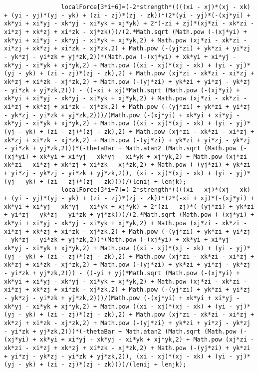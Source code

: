 \begin{lstlisting}
				localForce[3*i+6]=(-2*strength*((((xi - xj)*(xj - xk) + (yi - yj)*(yj - yk) + (zi - zj)*(zj - zk))*(2*(yi - yj)*(-(xj*yi) + xk*yi + xi*yj - xk*yj - xi*yk + xj*yk) + 2*(-zi + zj)*(xj*zi - xk*zi - xi*zj + xk*zj + xi*zk - xj*zk)))/(2.*Math.sqrt (Math.pow (-(xj*yi) + xk*yi + xi*yj - xk*yj - xi*yk + xj*yk,2) + Math.pow (xj*zi - xk*zi - xi*zj + xk*zj + xi*zk - xj*zk,2) + Math.pow (-(yj*zi) + yk*zi + yi*zj - yk*zj - yi*zk + yj*zk,2))*(Math.pow (-(xj*yi) + xk*yi + xi*yj - xk*yj - xi*yk + xj*yk,2) + Math.pow ((xi - xj)*(xj - xk) + (yi - yj)*(yj - yk) + (zi - zj)*(zj - zk),2) + Math.pow (xj*zi - xk*zi - xi*zj + xk*zj + xi*zk - xj*zk,2) + Math.pow (-(yj*zi) + yk*zi + yi*zj - yk*zj - yi*zk + yj*zk,2))) - ((-xi + xj)*Math.sqrt (Math.pow (-(xj*yi) + xk*yi + xi*yj - xk*yj - xi*yk + xj*yk,2) + Math.pow (xj*zi - xk*zi - xi*zj + xk*zj + xi*zk - xj*zk,2) + Math.pow (-(yj*zi) + yk*zi + yi*zj - yk*zj - yi*zk + yj*zk,2)))/(Math.pow (-(xj*yi) + xk*yi + xi*yj - xk*yj - xi*yk + xj*yk,2) + Math.pow ((xi - xj)*(xj - xk) + (yi - yj)*(yj - yk) + (zi - zj)*(zj - zk),2) + Math.pow (xj*zi - xk*zi - xi*zj + xk*zj + xi*zk - xj*zk,2) + Math.pow (-(yj*zi) + yk*zi + yi*zj - yk*zj - yi*zk + yj*zk,2)))*(-thetaBar + Math.atan2 (Math.sqrt (Math.pow (-(xj*yi) + xk*yi + xi*yj - xk*yj - xi*yk + xj*yk,2) + Math.pow (xj*zi - xk*zi - xi*zj + xk*zj + xi*zk - xj*zk,2) + Math.pow (-(yj*zi) + yk*zi + yi*zj - yk*zj - yi*zk + yj*zk,2)), (xi - xj)*(xj - xk) + (yi - yj)*(yj - yk) + (zi - zj)*(zj - zk))))/(lenij + lenjk);
				localForce[3*i+7]=(-2*strength*((((xi - xj)*(xj - xk) + (yi - yj)*(yj - yk) + (zi - zj)*(zj - zk))*(2*(-xi + xj)*(-(xj*yi) + xk*yi + xi*yj - xk*yj - xi*yk + xj*yk) + 2*(zi - zj)*(-(yj*zi) + yk*zi + yi*zj - yk*zj - yi*zk + yj*zk)))/(2.*Math.sqrt (Math.pow (-(xj*yi) + xk*yi + xi*yj - xk*yj - xi*yk + xj*yk,2) + Math.pow (xj*zi - xk*zi - xi*zj + xk*zj + xi*zk - xj*zk,2) + Math.pow (-(yj*zi) + yk*zi + yi*zj - yk*zj - yi*zk + yj*zk,2))*(Math.pow (-(xj*yi) + xk*yi + xi*yj - xk*yj - xi*yk + xj*yk,2) + Math.pow ((xi - xj)*(xj - xk) + (yi - yj)*(yj - yk) + (zi - zj)*(zj - zk),2) + Math.pow (xj*zi - xk*zi - xi*zj + xk*zj + xi*zk - xj*zk,2) + Math.pow (-(yj*zi) + yk*zi + yi*zj - yk*zj - yi*zk + yj*zk,2))) - ((-yi + yj)*Math.sqrt (Math.pow (-(xj*yi) + xk*yi + xi*yj - xk*yj - xi*yk + xj*yk,2) + Math.pow (xj*zi - xk*zi - xi*zj + xk*zj + xi*zk - xj*zk,2) + Math.pow (-(yj*zi) + yk*zi + yi*zj - yk*zj - yi*zk + yj*zk,2)))/(Math.pow (-(xj*yi) + xk*yi + xi*yj - xk*yj - xi*yk + xj*yk,2) + Math.pow ((xi - xj)*(xj - xk) + (yi - yj)*(yj - yk) + (zi - zj)*(zj - zk),2) + Math.pow (xj*zi - xk*zi - xi*zj + xk*zj + xi*zk - xj*zk,2) + Math.pow (-(yj*zi) + yk*zi + yi*zj - yk*zj - yi*zk + yj*zk,2)))*(-thetaBar + Math.atan2 (Math.sqrt (Math.pow (-(xj*yi) + xk*yi + xi*yj - xk*yj - xi*yk + xj*yk,2) + Math.pow (xj*zi - xk*zi - xi*zj + xk*zj + xi*zk - xj*zk,2) + Math.pow (-(yj*zi) + yk*zi + yi*zj - yk*zj - yi*zk + yj*zk,2)), (xi - xj)*(xj - xk) + (yi - yj)*(yj - yk) + (zi - zj)*(zj - zk))))/(lenij + lenjk);

\end{lstlisting}
